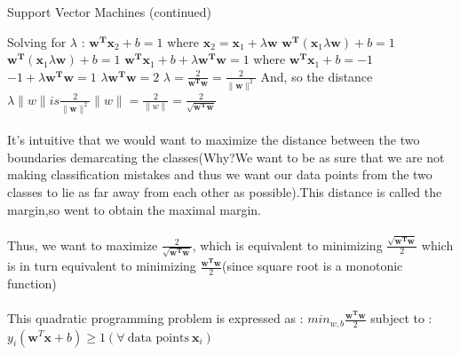 \documentclass[a4paper]{article}
\begin{document}
\clearpage

\begin{algorithm}
  \ContinuedFloat
  \caption{Support Vector Machines (continued)}
  \begin{algorithmic}
      \State
Solving for $\lambda$ : $\textbf{w}^\textbf{T}\textbf{x}_{2} + b = 1$ where $\textbf{x}_{2} = \textbf{x}_{1} +   \lambda\textbf{w} $ \newline $\textbf{w}^\textbf{T}(\textbf{x}_{1} \lambda\textbf{w}) +  b = 1$  
$\textbf{w}^\textbf{T}(\textbf{x}_{1} \lambda\textbf{w}) +  b = 1$ \newline $\textbf{w}^\textbf{T}\textbf{x}_{1} + b + \lambda\textbf{w}^\textbf{T}\textbf{w} = 1 $ where $\textbf{w}^\textbf{T}\textbf{x}_{1} + b = -1 $  \newline $-1 + \lambda\textbf{w}^\textbf{T}\textbf{w} = 1$ \newline $\lambda\textbf{w}^\textbf{T}\textbf{w} = 2$
\newline $\lambda = \frac{2}{\textbf{w}^\textbf{T}\textbf{w}}  = \frac{2}{\|\textbf{w}\|^2}$ \newline And, so the distance $\lambda\|w\| is   \frac{2}{\|\textbf{w}\|^2}\|w\| = \frac{2}{\|w\|} = \frac{2}{\sqrt{\textbf{w}^\textbf{T}\textbf{w}}}$



\paragraph{}
It's intuitive that we would want to maximize the distance between the two boundaries demarcating the classes(Why?We want to be as sure that we are not making classification mistakes and thus we want our data points from the two classes to lie as far away from each other as possible).This distance is called the margin,so went to obtain the maximal margin.

      
   \paragraph{}
Thus, we want to maximize $\frac{2}{\sqrt{\textbf{w}^\textbf{T}\textbf{w}}}$, which is equivalent to minimizing $\frac{\sqrt{\textbf{w}^\textbf{T}\textbf{w}}}{2}$ which is in turn equivalent to minimizing $\frac{\textbf{w}^\textbf{T}\textbf{w}}{2}$(since square root is a monotonic function)
      
   \paragraph{}
This quadratic programming problem is expressed as :\newline
 $min_{w,b}\frac{\textbf{w}^\textbf{T}\textbf{w}}{2}$ \newline
 subject to : $y_{i}(\textbf{w}^{T}\textbf{x} + b) \geq 1 (\forall \ \text{data points} \ \textbf{x}_{i} )$
   

\end{algorithmic}
\end{algorithm}
\end{document}
